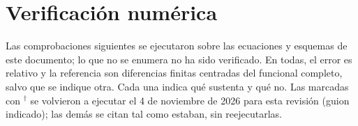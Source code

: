 \documentclass[11pt]{article}
\numberwithin{equation}{section}
\theoremstyle{plain}
\theoremstyle{definition}
\theoremstyle{remark}
\begin{document}
\section{Verificación numérica}
\label{sec:verif}

Las comprobaciones siguientes se ejecutaron sobre las ecuaciones y esquemas de este documento; lo que no se enumera
no ha sido verificado. En todas, el error es relativo y la referencia son diferencias finitas centradas del
funcional completo, salvo que se indique otra. Cada una indica qué sustenta y qué no. Las marcadas con $^\dagger$ se volvieron a ejecutar el 4 de noviembre de 2026 para esta revisión (guion indicado);
las demás se citan tal como estaban, sin reejecutarlas.
\end{document}
